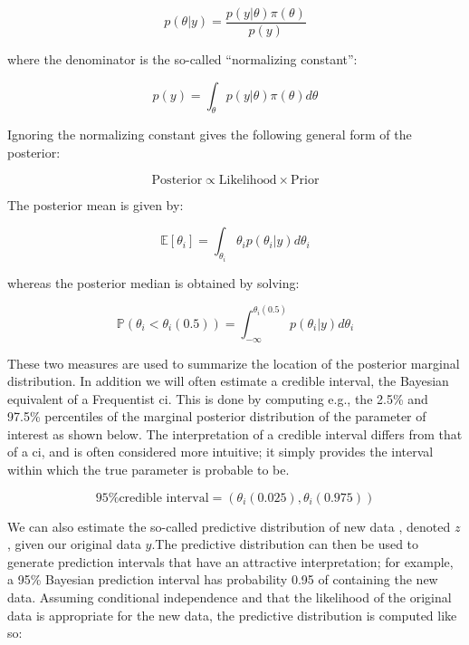 \documentclass{report}
\begin{document}
\begin{equation}\label{eq:ols-bayes-posterior}
    p(\theta | y) = \frac{p(y | \theta) \pi(\theta)}{p(y)}
\end{equation}

where the denominator is the so-called ``normalizing constant'':

\begin{equation}\label{eq:ols-bayes-norm-constant}
    p(y) = \int_\theta p(y | \theta) \pi(\theta) d\theta
\end{equation}

Ignoring the normalizing constant gives the following general form of the posterior:

\begin{equation}\label{eq:ols-bayes-general-concept}
    \text{Posterior} \propto \text{Likelihood} \times \text{Prior}
\end{equation}

The posterior mean is given by:

\begin{equation}\label{eq:ols-bayes-posterior-mean}
    \mathbb{E}[\theta_i] = \int_{\theta_i} \theta_i p(\theta_i | y) d\theta_i
\end{equation}

whereas the posterior median is obtained by solving:

\begin{equation}\label{eq:ols-bayes-posterior-median}
    \mathbb{P}(\theta_i < \theta_i(0.5)) = \int_{-\infty}^{\theta_i(0.5)} p(\theta_i | y) d\theta_i
\end{equation}

These two measures are used to summarize the location of the posterior marginal distribution. In addition we will often estimate a credible interval, the Bayesian equivalent of a Frequentist \gls{ci}. This is done by computing e.g., the 2.5\% and 97.5\% percentiles of the marginal posterior distribution of the parameter of interest as shown below. The interpretation of a credible interval differs from that of a \gls{ci}, and is often considered more intuitive; it simply provides the interval within which the true parameter is probable to be. 

\begin{equation}\label{eq:ols-bayes-credible-interval}
    \text{95\% credible interval} = \left(\theta_i(0.025), \theta_i(0.975)\right)
\end{equation}

We can also estimate the so-called predictive distribution of new data , denoted $z$, given our original data $y$.The predictive distribution can then be used to generate prediction intervals that have an attractive interpretation; for example, a 95\% Bayesian prediction interval has probability 0.95 of containing the new data. Assuming conditional independence and that the likelihood of the original data is appropriate for the new data, the predictive distribution is computed like so:
\end{document}
